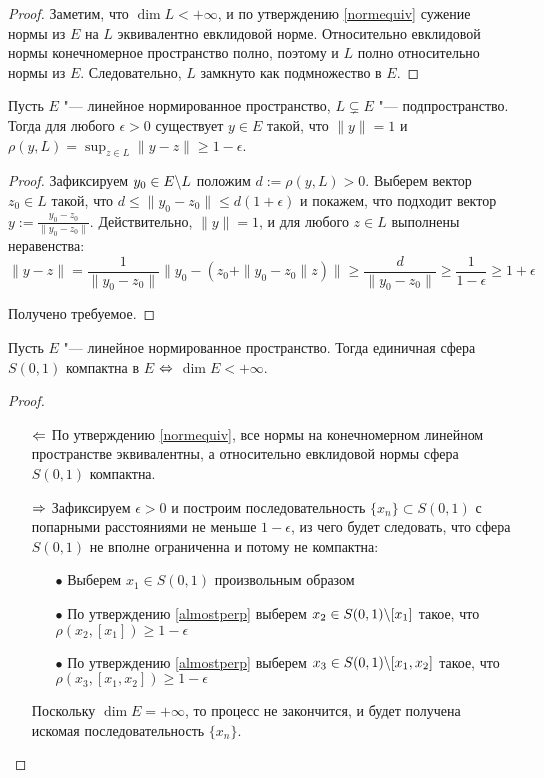 \begin{proof}
	Заметим, что $\dim L < +\infty$, и по утверждению \ref{normequiv} сужение нормы из $E$ на $L$ эквивалентно евклидовой норме. Относительно евклидовой нормы конечномерное пространство полно, поэтому и $L$ полно относительно нормы из $E$. Следовательно, $L$ замкнуто как подмножество в $E$.
\end{proof}

\begin{proposition}\label{almostperp}
	Пусть $E$ "--- линейное нормированное пространство, $L \subsetneq E$ "--- подпространство. Тогда для любого $\epsilon > 0$ существует $y \in E$ такой, что $\|y\| = 1$ и $\rho(y, L) = \sup_{z \in L}\|y - z\| \ge 1 - \epsilon$.
\end{proposition}

\begin{proof}
		Зафиксируем $y_0 \in E \backslash L$ положим $d := \rho(y, L) > 0$. Выберем вектор $z_0 \in L$ такой, что $d \le \|y_0 - z_0\| \le d(1 + \epsilon)$ и покажем, что подходит вектор $y := \frac{y_0 - z_0}{\|y_0 - z_0\|}$. Действительно, $\|y\| = 1$, и для любого $z \in L$ выполнены неравенства:
		\[\|y - z\| = \frac1{\|y_0 - z_0\|}\big\|y_0 - (z_0 + \|y_0 - z_0\|z)\big\| \ge \frac{d}{\|y_0 - z_0\|} \ge \frac1{1-\epsilon} \ge 1 + \epsilon\]

		Получено требуемое.
\end{proof}

\begin{theorem}[Рисса]\label{thm4.1}
	Пусть $E$ "--- линейное нормированное пространство. Тогда единичная сфера $S(0, 1)$ компактна в $E$ $\Leftrightarrow$ $\dim E < +\infty$.
\end{theorem}

\begin{proof}~
	\begin{itemize}
		\item[$\Leftarrow$] По утверждению \ref{normequiv}, все нормы на конечномерном линейном пространстве эквивалентны, а относительно евклидовой нормы сфера $S(0, 1)$ компактна.
  
  		\item[$\Rightarrow$] Зафиксируем $\epsilon > 0$ и построим последовательность $\{x_n\} \subset S(0, 1)$ с попарными расстояниями не меньше $1 - \epsilon$, из чего будет следовать, что сфера $S(0, 1)$ не вполне ограниченна и потому не компактна:
		\begin{itemize}
			\item[$\bullet$] Выберем $x_1 \in S(0, 1)$ произвольным образом
			\item[$\bullet$] По утверждению \ref{almostperp} выберем $x_2 \in S(0, 1) \backslash [x_1]$ такое, что $\rho(x_2, [x_1]) \ge 1- \epsilon$
			\item[$\bullet$] По утверждению \ref{almostperp} выберем $x_3 \in S(0, 1) \backslash [x_1, x_2]$ такое, что $\rho(x_3, [x_1, x_2]) \ge 1- \epsilon$
		\end{itemize}

		Поскольку $\dim E = + \infty$, то процесс не закончится, и будет получена искомая последовательность $\{x_n\}$.\qedhere
	\end{itemize}
\end{proof}

